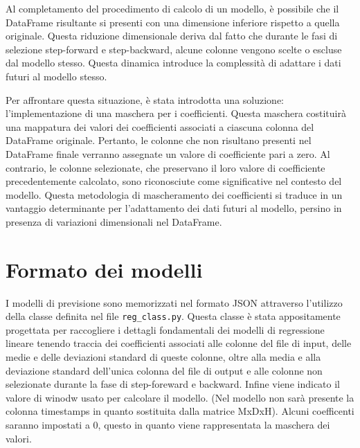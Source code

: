 \documentclass{rapportECL}
\begin{document}
Al completamento del procedimento di calcolo di un modello, è possibile che il DataFrame risultante si presenti con una dimensione inferiore rispetto
a quella originale. Questa riduzione dimensionale deriva dal fatto che durante le fasi di selezione step-forward e step-backward, alcune colonne vengono 
scelte o escluse dal modello stesso. Questa dinamica introduce la complessità di adattare i dati futuri al modello stesso.

Per affrontare questa situazione, è stata introdotta una soluzione: l'implementazione di una maschera per i coefficienti. 
Questa maschera costituirà una mappatura dei valori dei coefficienti associati a ciascuna colonna del DataFrame originale. 
Pertanto, le colonne che non risultano presenti nel DataFrame finale verranno assegnate un valore di coefficiente pari a zero. Al contrario, le colonne 
selezionate, che preservano il loro valore di coefficiente precedentemente calcolato, sono riconosciute come significative nel contesto del modello. 
Questa metodologia di mascheramento dei coefficienti si traduce in un vantaggio determinante per l'adattamento dei dati futuri al modello, 
persino in presenza di variazioni dimensionali nel DataFrame.

\section{Formato dei modelli}

I modelli di previsione sono memorizzati nel formato JSON attraverso l'utilizzo della classe definita nel file \texttt{reg\_class.py}.
Questa classe è stata appositamente progettata per raccogliere i dettagli fondamentali dei modelli di regressione lineare 
tenendo traccia dei coefficienti associati alle colonne del file di input, delle medie e delle deviazioni standard di queste colonne, 
oltre alla media e alla deviazione standard dell'unica colonna del file di output e alle colonne non selezionate durante la fase di step-foreward
e backward. Infine viene indicato il valore di winodw usato per calcolare il modello.
(Nel modello non sarà presente la colonna timestamps in quanto sostituita dalla matrice MxDxH). Alcuni coefficenti saranno impostati a 0, 
questo in quanto viene rappresentata la maschera dei valori.
\end{document}
